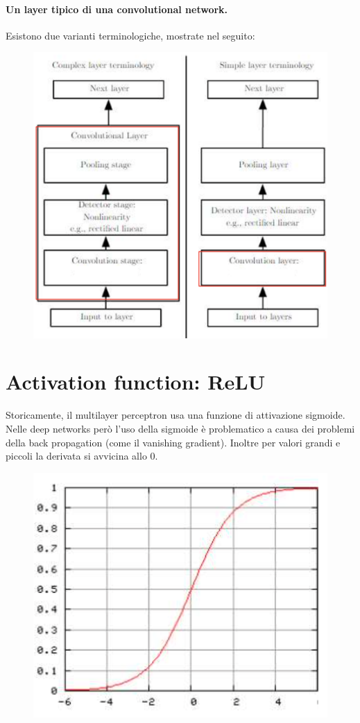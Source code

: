 \paragraph{Un layer tipico di una convolutional network.} Esistono due varianti terminologiche, mostrate nel seguito:
\begin{figure}[!h]
    \includegraphics[scale=.4]{images/cnn/typical_layer.png}
    \centering
\end{figure}
\section{Activation function: ReLU}
Storicamente, il multilayer perceptron usa una funzione di attivazione sigmoide. Nelle deep networks però l'uso della sigmoide è problematico a causa dei problemi della back propagation (come il vanishing gradient). Inoltre per valori grandi e piccoli la derivata si avvicina allo $0$.
\begin{figure}[!h]
    \includegraphics[scale=.4]{images/cnn/sigmoid.png}
    \centering
\end{figure}


